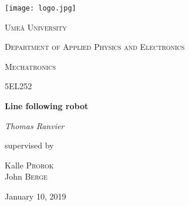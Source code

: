 \begin{titlepage}
    \centering
    \texttt{[image: logo.jpg]} \par\vspace{1cm}
    {\scshape\LARGE Umeå University \par}
    {\scshape\Large Department of Applied Physics and Electronics\par}
    \vspace{1cm}
    {\scshape\Large Mechatronics\par}
    \vspace{0.5cm}
    {\scshape\large 5EL252\par}
    \vspace{1.5cm}
    {\huge\bfseries Line following robot\par}
    \vspace{2cm}
    {\Large\itshape Thomas Ranvier\par}
    \vfill 
    {\large supervised by\par}
    Kalle \textsc{Prorok}
    \\
    John \textsc{Berge}
    \vfill 
    {\large January 10, 2019\par}
\end{titlepage}
